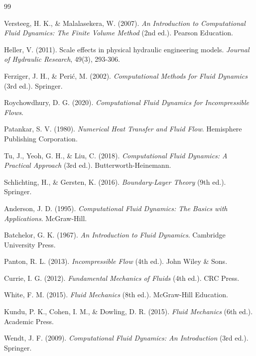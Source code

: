 \begin{thebibliography}{99}

Versteeg, H. K., \& Malalasekera, W. (2007). \emph{An Introduction to Computational Fluid Dynamics: The Finite Volume Method} (2nd ed.). Pearson Education.

Heller, V. (2011). Scale effects in physical hydraulic engineering models. \emph{Journal of Hydraulic Research}, 49(3), 293-306.

Ferziger, J. H., \& Perić, M. (2002). \emph{Computational Methods for Fluid Dynamics} (3rd ed.). Springer.

Roychowdhury, D. G. (2020). \emph{Computational Fluid Dynamics for Incompressible Flows}.

Patankar, S. V. (1980). \emph{Numerical Heat Transfer and Fluid Flow}. Hemisphere Publishing Corporation.

Tu, J., Yeoh, G. H., \& Liu, C. (2018). \emph{Computational Fluid Dynamics: A Practical Approach} (3rd ed.). Butterworth-Heinemann.

Schlichting, H., \& Gersten, K. (2016). \emph{Boundary-Layer Theory} (9th ed.). Springer.

Anderson, J. D. (1995). \emph{Computational Fluid Dynamics: The Basics with Applications}. McGraw-Hill.

Batchelor, G. K. (1967). \emph{An Introduction to Fluid Dynamics}. Cambridge University Press.

Panton, R. L. (2013). \emph{Incompressible Flow} (4th ed.). John Wiley \& Sons.

Currie, I. G. (2012). \emph{Fundamental Mechanics of Fluids} (4th ed.). CRC Press.

White, F. M. (2015). \emph{Fluid Mechanics} (8th ed.). McGraw-Hill Education.

Kundu, P. K., Cohen, I. M., \& Dowling, D. R. (2015). \emph{Fluid Mechanics} (6th ed.). Academic Press.

Wendt, J. F. (2009). \emph{Computational Fluid Dynamics: An Introduction} (3rd ed.). Springer.


\end{thebibliography}
